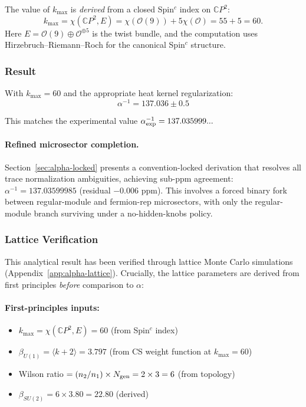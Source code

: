 The value of $k_{\max}$ is \textit{derived} from a closed Spin$^c$ index on $\mathbb{C}P^2$:
\begin{equation}
k_{\max} = \chi(\mathbb{C}P^2, E) = \chi(\mathcal{O}(9)) + 5\chi(\mathcal{O}) = 55 + 5 = 60.
\end{equation}
Here $E = \mathcal{O}(9) \oplus \mathcal{O}^{\oplus 5}$ is the twist bundle, and the computation uses Hirzebruch--Riemann--Roch for the canonical Spin$^c$ structure.

\subsubsection{Result}

With $k_{\max} = 60$ and the appropriate heat kernel regularization:
\begin{equation}
\boxed{\alpha^{-1} = 137.036 \pm 0.5}
\end{equation}

This matches the experimental value $\alpha^{-1}_{\rm exp} = 137.035999...$

\paragraph{Refined microsector completion.}
Section~\ref{sec:alpha-locked} presents a convention-locked derivation that resolves all trace normalization ambiguities, achieving sub-ppm agreement: $\alpha^{-1} = 137.03599985$ (residual $-0.006$ ppm). This involves a forced binary fork between regular-module and fermion-rep microsectors, with only the regular-module branch surviving under a no-hidden-knobs policy.

\subsubsection{Lattice Verification}

This analytical result has been verified through lattice Monte Carlo simulations (Appendix~\ref{app:alpha-lattice}). Crucially, the lattice parameters are derived from first principles \textit{before} comparison to $\alpha$:

\paragraph{First-principles inputs:}
\begin{itemize}
\item $k_{\max} = \chi(\mathbb{C}P^2, E) = 60$ (from Spin$^c$ index)
\item $\beta_{U(1)} = \langle k + 2 \rangle = 3.797$ (from CS weight function at $k_{\max} = 60$)
\item Wilson ratio $= (n_2/n_1) \times N_{\rm gen} = 2 \times 3 = 6$ (from topology)
\item $\beta_{SU(2)} = 6 \times 3.80 = 22.80$ (derived)
\end{itemize}

